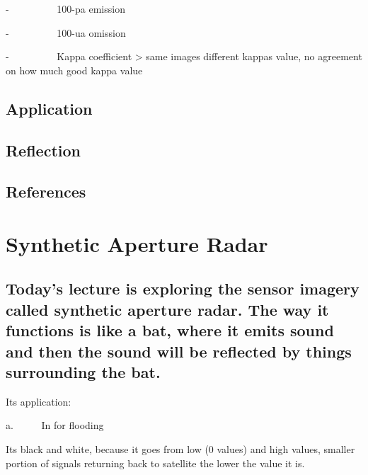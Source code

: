 \documentclass[
  letterpaper,
  DIV=11,
  numbers=noendperiod]{scrreprt}
\begin{document}
-~~~~~~~~~ 100-pa emission

-~~~~~~~~~ 100-ua omission

-~~~~~~~~~ Kappa coefficient \textgreater{} same images different kappas
value, no agreement on how much good kappa value

\hypertarget{application-5}{%
\section{Application}\label{application-5}}

\hypertarget{reflection-4}{%
\section{Reflection}\label{reflection-4}}

\hypertarget{references-4}{%
\section{References}\label{references-4}}


\hypertarget{synthetic-aperture-radar}{%
\chapter{Synthetic Aperture Radar}\label{synthetic-aperture-radar}}

\hypertarget{todays-lecture-is-exploring-the-sensor-imagery-called-synthetic-aperture-radar.-the-way-it-functions-is-like-a-bat-where-it-emits-sound-and-then-the-sound-will-be-reflected-by-things-surrounding-the-bat.}{%
\section{Today's lecture is exploring the sensor imagery called
synthetic aperture radar. The way it functions is like a bat, where it
emits sound and then the sound will be reflected by things surrounding
the
bat.}\label{todays-lecture-is-exploring-the-sensor-imagery-called-synthetic-aperture-radar.-the-way-it-functions-is-like-a-bat-where-it-emits-sound-and-then-the-sound-will-be-reflected-by-things-surrounding-the-bat.}}

Its application:

a.~~~~~ In for flooding

Its black and white, because it goes from low (0 values) and high
values, smaller portion of signals returning back to satellite the lower
the value it is.
\end{document}
